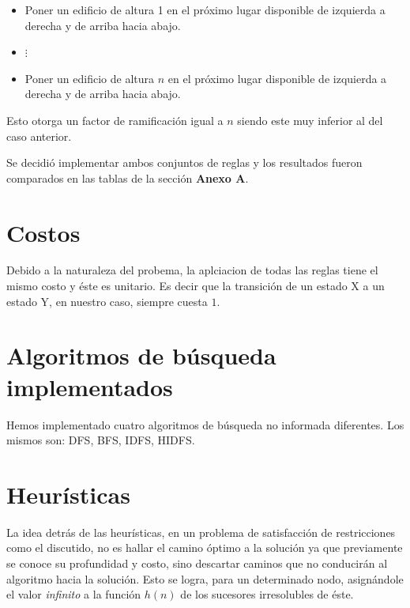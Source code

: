 \documentclass[%
    final,
    reprint,
    notitlepage,
    narroweqnarray,
    inline,
    twoside,
    invited
    ]{ieee}
\begin{document}
\begin{itemize}
\item Poner un edificio de altura 1 en el próximo lugar disponible de izquierda a derecha y de arriba hacia abajo.
\item $\vdots$
\item Poner un edificio de altura $n$ en el próximo lugar disponible de izquierda a derecha y de arriba hacia abajo.
\end{itemize}

\par Esto otorga un factor de ramificación igual a $n$ siendo este muy inferior al del caso anterior. \\
\par Se decidió implementar ambos conjuntos de reglas y los resultados fueron comparados en las tablas de la sección \textbf{Anexo A}.

\section{Costos}

\par Debido a la naturaleza del probema, la aplciacion de todas las reglas tiene el mismo costo y éste es unitario. Es decir que la transición de un estado X a un estado Y, en nuestro caso, siempre cuesta $1$.

\section{Algoritmos de búsqueda implementados}

\par Hemos implementado cuatro algoritmos de búsqueda no informada diferentes. Los mismos son: DFS, BFS, IDFS, HIDFS.

\section{Heurísticas}

\par La idea detrás de las heurísticas, en un  problema de satisfacción de restricciones como el discutido, no es hallar el camino óptimo a la solución ya que previamente se conoce su profundidad y  costo,  sino descartar caminos que no conducirán al algoritmo hacia la solución. Esto se logra, para un determinado nodo, asignándole el valor \textit{infinito} a la función $h(n)$ de los sucesores irresolubles de éste.\\
\end{document}
